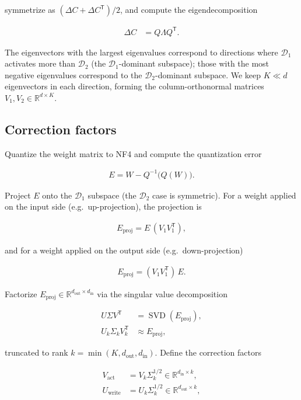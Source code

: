 \documentclass[11pt,a4paper]{article}
\DeclareMathOperator{\svd}{SVD}
\begin{document}
symmetrize as $(\Delta C + \Delta C^{\mathsf{T}})/2$, and compute the
eigendecomposition

\begin{align}
  \Delta C &= Q \Lambda Q^{\mathsf{T}}.
\end{align}

The eigenvectors with the largest eigenvalues correspond to
directions where $\mathcal{D}_1$ activates more than $\mathcal{D}_2$
(the $\mathcal{D}_1$-dominant subspace); those with the most negative
eigenvalues correspond to the $\mathcal{D}_2$-dominant subspace.  We
keep $K \ll d$ eigenvectors in each direction, forming the
column-orthonormal matrices $V_1, V_2 \in \mathbb{R}^{d \times K}$.

\subsection{Correction factors}

Quantize the weight matrix to NF4 and compute the quantization error

\begin{align}
  E = W - Q^{-1}\bigl(Q(W)\bigr).
\end{align}

Project $E$ onto the $\mathcal{D}_1$ subspace (the $\mathcal{D}_2$ case
is symmetric).  For a weight applied on the input side (e.g.\
up-projection), the projection is

\begin{align}
  E_{\text{proj}} = E\, (V_1 V_1^{\mathsf{T}}),
\end{align}

and for a weight applied on the output side (e.g.\ down-projection)

\begin{align}
  E_{\text{proj}} = (V_1 V_1^{\mathsf{T}})\, E.
\end{align}

Factorize $E_{\text{proj}} \in \mathbb{R}^{d_{\text{out}} \times
d_{\text{in}}}$ via the singular value decomposition

\begin{align}
  U \Sigma V^{\mathsf{T}} &= \svd(E_{\text{proj}}), \\
  U_k \Sigma_k V_k^{\mathsf{T}} &\approx E_{\text{proj}},
\end{align}

truncated to rank $k = \min(K, d_{\text{out}}, d_{\text{in}})$.
Define the correction factors

\begin{align}
  V_{\text{act}} &= V_k \Sigma_k^{1/2} \in \mathbb{R}^{d_{\text{in}} \times k}, \\
  U_{\text{write}} &= U_k \Sigma_k^{1/2} \in \mathbb{R}^{d_{\text{out}} \times k},
\end{align}
\end{document}
